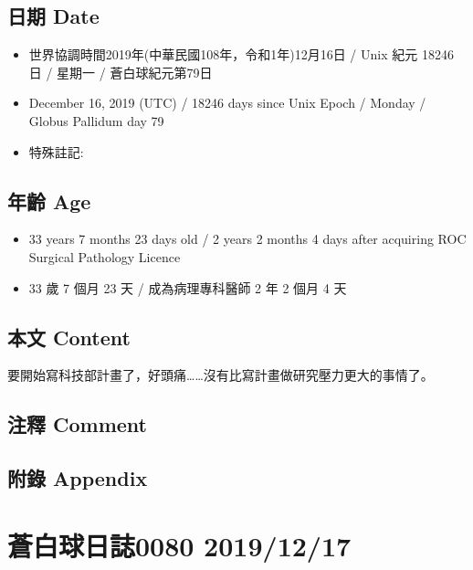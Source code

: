 \documentclass[a5paper, 12pt
]{book}
\providecommand{\tightlist}{%
  \setlength{\itemsep}{0pt}\setlength{\parskip}{0pt}}
\begin{document}
\hypertarget{ux65e5ux671f-date-15}{%
\subsection{日期 Date}\label{ux65e5ux671f-date-15}}

\begin{itemize}
\tightlist
\item
  世界協調時間2019年(中華民國108年，令和1年)12月16日 / Unix 紀元 18246
  日 / 星期一 / 蒼白球紀元第79日
\item
  December 16, 2019 (UTC) / 18246 days since Unix Epoch / Monday /
  Globus Pallidum day 79
\item
  特殊註記:
\end{itemize}

\hypertarget{ux5e74ux9f61-age-15}{%
\subsection{年齡 Age}\label{ux5e74ux9f61-age-15}}

\begin{itemize}
\tightlist
\item
  33 years 7 months 23 days old / 2 years 2 months 4 days after
  acquiring ROC Surgical Pathology Licence
\item
  33 歲 7 個月 23 天 / 成為病理專科醫師 2 年 2 個月 4 天
\end{itemize}

\hypertarget{ux672cux6587-content-15}{%
\subsection{本文 Content}\label{ux672cux6587-content-15}}

要開始寫科技部計畫了，好頭痛\ldots\ldots 沒有比寫計畫做研究壓力更大的事情了。

\hypertarget{ux6ce8ux91cb-comment-14}{%
\subsection{注釋 Comment}\label{ux6ce8ux91cb-comment-14}}

\hypertarget{ux9644ux9304-appendix-15}{%
\subsection{附錄 Appendix}\label{ux9644ux9304-appendix-15}}

\hypertarget{ux84bcux767dux7403ux65e5ux8a8c0080-20191217}{%
\section{蒼白球日誌0080
2019/12/17}\label{ux84bcux767dux7403ux65e5ux8a8c0080-20191217}}
\end{document}
